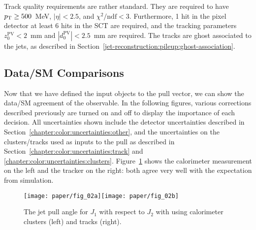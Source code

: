 Track quality requirements are rather standard. They are required to have $p_{\text{T}} \geq 500$~MeV, $|\eta| < 2.5$, and $\chi^2/\mathrm{ndf} < 3$. Furthermore, 1 hit in the pixel detector at least 6 hits in the SCT are required, and the tracking parameters $z_0^\mathrm{PV} < 2$~mm and $|d_0^\mathrm{PV}| < 2.5$~mm are required. The tracks are ghost associated to the jets, as described in Section~\ref{jet-reconstruction:pileup:ghost-association}.

\subsection{Data/SM Comparisons}
\label{chapter:color:comparisons}

Now that we have defined the input objects to the pull vector, we can show the data/SM agreement of the observable. In the following figures, various corrections described previously are turned on and off to display the importance of each decision. All uncertainties shown include the detector uncertainties described in Section~\ref{chapter:color:uncertainties:other}, and the uncertainties on the clusters/tracks used as inputs to the pull as described in Section~\ref{chapter:color:uncertainties:track} and \ref{chapter:color:uncertainties:clusters}. Figure~\ref{fig:color:substructure:pull_fixed} shows the calorimeter measurement on the left and the tracker on the right: both agree very well with the expectation from simulation.


\begin{figure}[h!]
\begin{center}
\texttt{[image: paper/fig\_02a]}\texttt{[image: paper/fig\_02b]}
 \caption{The jet pull angle for $J_1$ with respect to $J_2$ with using calorimeter clusters (left) and tracks (right).}
 \label{fig:color:substructure:pull_fixed}
  \end{center}
\end{figure}




